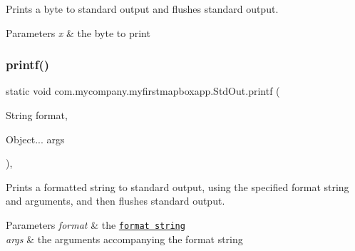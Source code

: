 Prints a byte to standard output and flushes standard output.


\begin{DoxyParams}{Parameters}
{\em x} & the byte to print \\
\hline
\end{DoxyParams}
\mbox{\label{classcom_1_1mycompany_1_1myfirstmapboxapp_1_1_std_out_a8c2a2831b1ce62a571515806ec4603b1}} 
\subsubsection{\texorpdfstring{printf()}{printf()}\hspace{0.1cm}{\footnotesize\ttfamily [1/2]}}
{\footnotesize\ttfamily static void com.\+mycompany.\+myfirstmapboxapp.\+Std\+Out.\+printf (\begin{DoxyParamCaption}\item[{String}]{format,  }\item[{Object...}]{args }\end{DoxyParamCaption})\hspace{0.3cm}{\ttfamily [inline]}, {\ttfamily [static]}}

Prints a formatted string to standard output, using the specified format string and arguments, and then flushes standard output.


\begin{DoxyParams}{Parameters}
{\em format} & the \href{http://docs.oracle.com/javase/7/docs/api/java/util/Formatter.html#syntax}{\tt format string} \\
\hline
{\em args} & the arguments accompanying the format string \\
\hline
\end{DoxyParams}
\mbox{\label{classcom_1_1mycompany_1_1myfirstmapboxapp_1_1_std_out_a14de43bb30dfdedb9e694aa3bd5d39e9}} 
